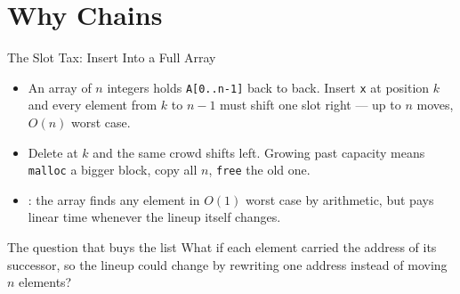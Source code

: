 \documentclass[aspectratio=169]{beamer}
\begin{document}
\section{Why Chains}


\begin{frame}{The Slot Tax: Insert Into a Full Array}
  \begin{itemize}
    \item An array of $n$ integers holds \texttt{A[0..n-1]} back to back.
      Insert \texttt{x} at position $k$ and every element from $k$ to $n-1$
      must shift one slot right --- up to $n$ moves, $O(n)$ worst case.
    \item Delete at $k$ and the same crowd shifts left. Growing past capacity
      means \texttt{malloc} a bigger block, copy all $n$, \texttt{free} the
      old one.
    \item {}: the array finds any element in $O(1)$
      worst case by arithmetic, but pays linear time whenever the lineup
      itself changes.
  \end{itemize}
  \begin{exampleblock}{The question that buys the list}
    What if each element carried the address of its successor, so the lineup
    could change by rewriting one address instead of moving $n$ elements?
  \end{exampleblock}
\end{frame}
\end{document}
